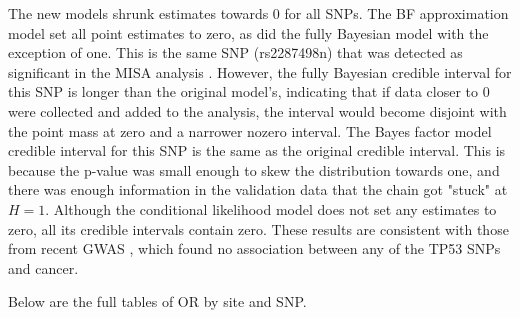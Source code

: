 \documentclass[AMA,STIX1COL]{WileyNJD-v2}\usepackage[]{graphicx}\usepackage[]{color}
\begin{document}
The new models shrunk estimates towards 0 for all SNPs. The BF approximation model set all point estimates to zero, as did the fully Bayesian model with the exception of one. This is the same SNP (rs2287498n) 
that was detected as significant in the MISA analysis \cite{schildkraut2010association}. However, the fully Bayesian credible interval for this SNP is longer than the original model's, indicating that if data closer to 0 were collected and added to the analysis, the interval would become disjoint with the point mass at zero and a narrower nozero interval.  The Bayes factor model credible interval for this SNP is the same as the original credible interval. This is because the p-value was small enough to skew the distribution towards one, and there was enough information in the validation data that the chain got "stuck" at $H = 1$. Although the conditional likelihood model does not set any estimates to zero, all its credible intervals contain zero. These results are consistent with those from recent GWAS \cite{phelan2017identification}, which found no association between any of the TP53 SNPs and cancer.

Below are the full tables of OR by site and SNP.
\end{document}
